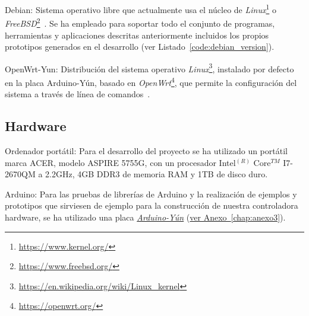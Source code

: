 \begin{definitionlist}

\item[Debian:] Sistema operativo libre que actualmente usa el núcleo de \textit{Linux}\footnote{\url{https://www.kernel.org/}} o \textit{FreeBSD}\footnote{\url{https://www.freebsd.org/}}~\cite{Debian}. Se ha empleado para soportar todo el conjunto de programas, herramientas y aplicaciones descritas anteriormente incluidos los propios prototipos generados en el desarrollo (ver Listado~\ref{code:debian_version}).

\item[OpenWrt-Yun:] Distribución del sistema operativo \textit{Linux}\footnote{\url{https://en.wikipedia.org/wiki/Linux_kernel}}, instalado por defecto en la placa Arduino-Yún, basado en \textit{OpenWrt}\footnote{\url{https://openwrt.org/}}, que permite la configuración del sistema a través de línea de comandos~\cite{Arduino-Yun}.
\end{definitionlist}




\subsection{Hardware}
\begin{definitionlist}
\item[Ordenador portátil:] Para el desarrollo del proyecto se ha utilizado un portátil marca ACER, modelo ASPIRE 5755G, con un procesador Intel$^{(R)}$ Core$^{TM}$ I7-2670QM a 2.2GHz, 4GB DDR3 de memoria \acs{RAM} y 1TB de disco duro.

\item[Arduino:] Para las pruebas de librerías de Arduino y la realización de ejemplos y prototipos que sirviesen de ejemplo para la construcción de nuestra controladora hardware, se ha utilizado una placa \hyperref[tab:arduino-yun]{\textit{Arduino-Yún}} (\hyperref[chap:anexo3]{ver Anexo~\ref{chap:anexo3}}).
\end{definitionlist}
